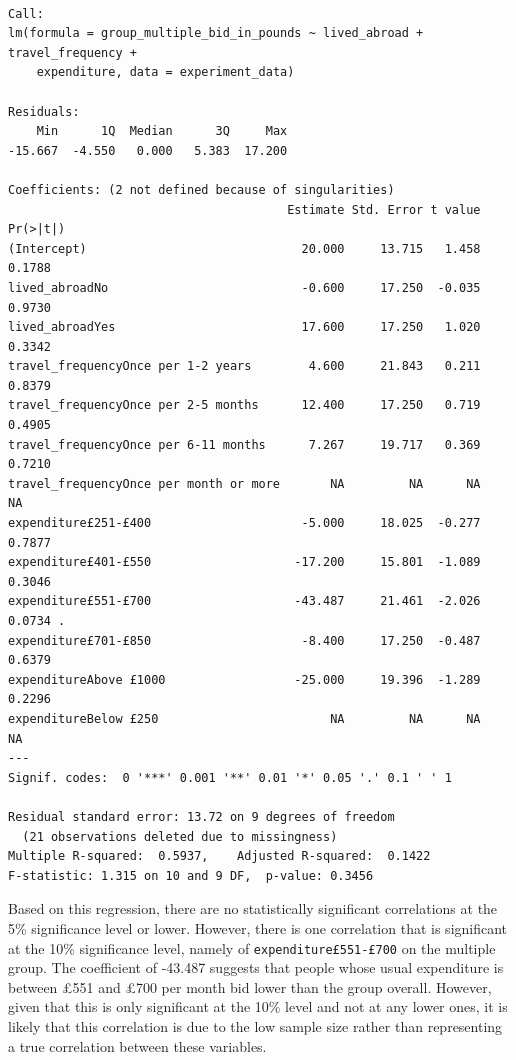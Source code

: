 \documentclass[
]{report}
\begin{document}
\begin{verbatim}

Call:
lm(formula = group_multiple_bid_in_pounds ~ lived_abroad + travel_frequency + 
    expenditure, data = experiment_data)

Residuals:
    Min      1Q  Median      3Q     Max 
-15.667  -4.550   0.000   5.383  17.200 

Coefficients: (2 not defined because of singularities)
                                       Estimate Std. Error t value Pr(>|t|)  
(Intercept)                              20.000     13.715   1.458   0.1788  
lived_abroadNo                           -0.600     17.250  -0.035   0.9730  
lived_abroadYes                          17.600     17.250   1.020   0.3342  
travel_frequencyOnce per 1-2 years        4.600     21.843   0.211   0.8379  
travel_frequencyOnce per 2-5 months      12.400     17.250   0.719   0.4905  
travel_frequencyOnce per 6-11 months      7.267     19.717   0.369   0.7210  
travel_frequencyOnce per month or more       NA         NA      NA       NA  
expenditure£251-£400                     -5.000     18.025  -0.277   0.7877  
expenditure£401-£550                    -17.200     15.801  -1.089   0.3046  
expenditure£551-£700                    -43.487     21.461  -2.026   0.0734 .
expenditure£701-£850                     -8.400     17.250  -0.487   0.6379  
expenditureAbove £1000                  -25.000     19.396  -1.289   0.2296  
expenditureBelow £250                        NA         NA      NA       NA  
---
Signif. codes:  0 '***' 0.001 '**' 0.01 '*' 0.05 '.' 0.1 ' ' 1

Residual standard error: 13.72 on 9 degrees of freedom
  (21 observations deleted due to missingness)
Multiple R-squared:  0.5937,    Adjusted R-squared:  0.1422 
F-statistic: 1.315 on 10 and 9 DF,  p-value: 0.3456
\end{verbatim}

Based on this regression, there are no statistically significant
correlations at the 5\% significance level or lower. However, there is
one correlation that is significant at the 10\% significance level,
namely of \texttt{expenditure£551-£700} on the multiple group. The
coefficient of -43.487 suggests that people whose usual expenditure is
between £551 and £700 per month bid lower than the group overall.
However, given that this is only significant at the 10\% level and not
at any lower ones, it is likely that this correlation is due to the low
sample size rather than representing a true correlation between these
variables.
\end{document}
